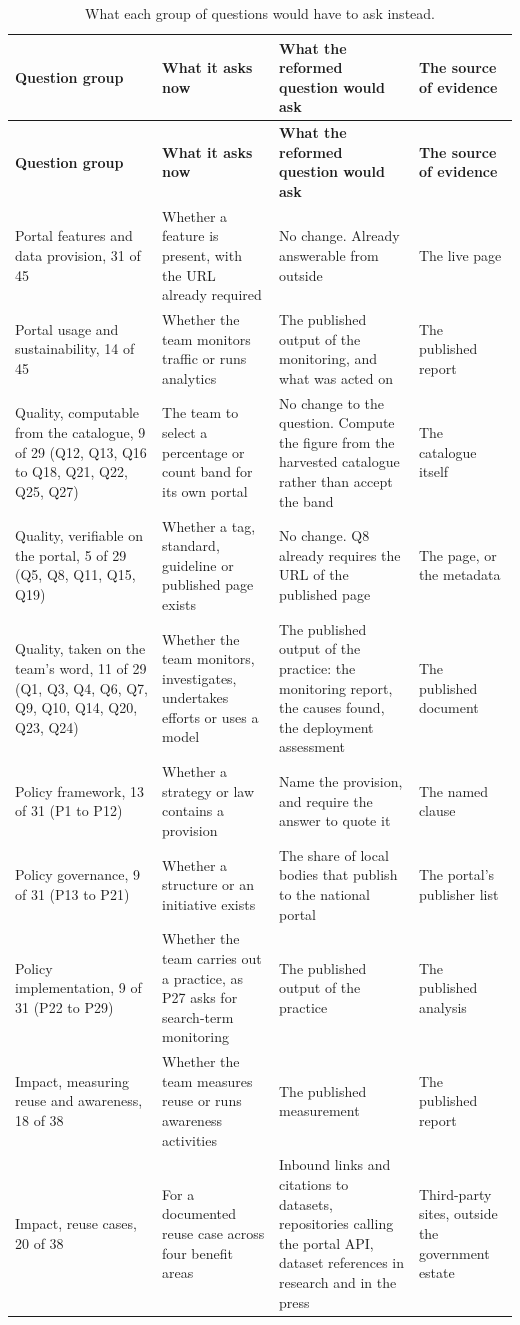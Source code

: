 {\small
\begin{longtable}[]{@{}
  L{0.2836}
  L{0.2321}
  L{0.3116}
  L{0.1727}@{}}
\caption{What each group of questions would have to ask instead.}\label{tab:reformulation}\\
\toprule\noalign{}
\textbf{Question group} & \textbf{What it asks now} & \textbf{What the reformed question would ask} & \textbf{The source of evidence} \\
\midrule\noalign{}
\endfirsthead
\toprule\noalign{}
\textbf{Question group} & \textbf{What it asks now} & \textbf{What the reformed question would ask} & \textbf{The source of evidence} \\
\midrule\noalign{}
\endhead
\bottomrule\noalign{}
\endlastfoot
Portal features and data provision, 31 of 45 & Whether a feature is present, with the URL already required & No change. Already answerable from outside & The live page \\
Portal usage and sustainability, 14 of 45 & Whether the team monitors traffic or runs analytics & The published output of the monitoring, and what was acted on & The published report \\
Quality, computable from the catalogue, 9 of 29 (Q12, Q13, Q16 to Q18, Q21, Q22, Q25, Q27) & The team to select a percentage or count band for its own portal & No change to the question. Compute the figure from the harvested catalogue rather than accept the band & The catalogue itself \\
Quality, verifiable on the portal, 5 of 29 (Q5, Q8, Q11, Q15, Q19) & Whether a tag, standard, guideline or published page exists & No change. Q8 already requires the URL of the published page & The page, or the metadata \\
Quality, taken on the team's word, 11 of 29 (Q1, Q3, Q4, Q6, Q7, Q9, Q10, Q14, Q20, Q23, Q24) & Whether the team monitors, investigates, undertakes efforts or uses a model & The published output of the practice: the monitoring report, the causes found, the deployment assessment & The published document \\
Policy framework, 13 of 31 (P1 to P12) & Whether a strategy or law contains a provision & Name the provision, and require the answer to quote it & The named clause \\
Policy governance, 9 of 31 (P13 to P21) & Whether a structure or an initiative exists & The share of local bodies that publish to the national portal & The portal's publisher list \\
Policy implementation, 9 of 31 (P22 to P29) & Whether the team carries out a practice, as P27 asks for search-term monitoring & The published output of the practice & The published analysis \\
Impact, measuring reuse and awareness, 18 of 38 & Whether the team measures reuse or runs awareness activities & The published measurement & The published report \\
Impact, reuse cases, 20 of 38 & For a documented reuse case across four benefit areas & Inbound links and citations to datasets, repositories calling the portal API, dataset references in research and in the press & Third-party sites, outside the government estate \\
\end{longtable}
}


